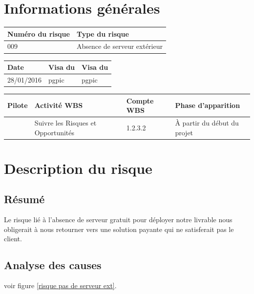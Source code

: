 \section*{Informations générales}
 
\begin{table}[H]
\centering
	\begin{tabularx}{16.8cm}{|X|X|}
	\hline
	\rowcolor{gray!40} Numéro du risque & Type du risque \\
	\hline
	009 & Absence de serveur extérieur \\
	\hline
	\end{tabularx}
\end{table}

\begin{table}[H]
\centering
	\begin{tabularx}{16.8cm}{|X|X|X|}
	\hline
	\rowcolor{gray!40} Date & Visa du \RQ & Visa du \CP \\
	\hline
	 28/01/2016 & pgpic & pgpic \\
	\hline
	\end{tabularx}
\end{table}

\begin{table}[H]
\centering
	\begin{tabularx}{16.8cm}{|X|X|X|X|}
	\hline
	\rowcolor{gray!40} Pilote & Activité WBS & Compte WBS & Phase d'apparition \\
	\hline
	 \Matthieu & Suivre les Risques et Opportunités & 1.2.3.2 & À partir du début du projet\\
	\hline
	\end{tabularx}
\end{table}

\section*{Description du risque}

\subsection*{Résumé}
	Le risque lié à l'absence de serveur gratuit pour déployer notre livrable nous obligerait à nous retourner vers une solution payante qui ne satisferait pas le client.
	
\subsection*{Analyse des causes}
	voir figure \ref{risque pas de serveur ext}.

